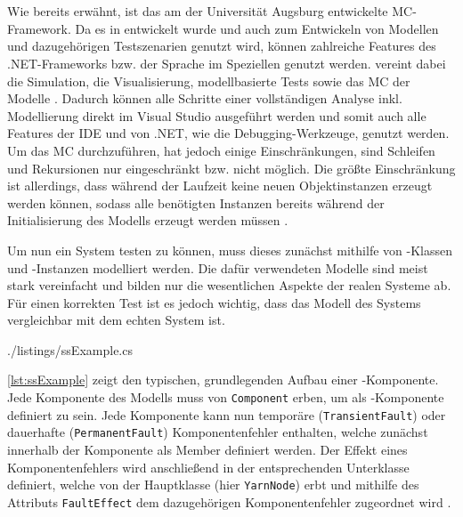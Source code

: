 \section{\sS}\label{sec:sSharp}

Wie bereits erwähnt, ist \sS das am \isse der Universität Augsburg entwickelte \ac{MC}-Framework. Da es in \cS entwickelt wurde und \cS auch zum Entwickeln von Modellen und dazugehörigen Testszenarien genutzt wird, können zahlreiche Features des .NET-Frameworks bzw. der Sprache \cS im Speziellen genutzt werden. \sS vereint dabei die Simulation, die Visualisierung, modellbasierte Tests sowie das MC der Modelle \cite{Habermaier2015,Habermaier2016}. Dadurch können alle Schritte einer vollständigen Analyse inkl. Modellierung direkt im Visual Studio ausgeführt werden und somit auch alle Features der IDE und von .NET, wie \zB die Debugging-Werkzeuge, genutzt werden. Um das \ac{MC} durchzuführen, hat \sS jedoch einige Einschränkungen, \uA sind Schleifen und Rekursionen nur eingeschränkt bzw. nicht möglich. Die größte Einschränkung ist allerdings, dass während der Laufzeit keine neuen Objektinstanzen erzeugt werden können, sodass alle benötigten Instanzen bereits während der Initialisierung des Modells erzeugt werden müssen \cite{Habermaier2015}.

Um nun ein System testen zu können, muss dieses zunächst mithilfe von \cS-Klassen und -Instanzen modelliert werden. Die dafür verwendeten Modelle sind meist stark vereinfacht und bilden nur die wesentlichen Aspekte der realen Systeme ab. Für einen korrekten Test ist es jedoch wichtig, dass das Modell des Systems vergleichbar mit dem echten System ist.


{./listings/ssExample.cs}

\autoref{lst:ssExample} zeigt den typischen, grundlegenden Aufbau einer \sS-Komponente. Jede Komponente des Modells muss von \texttt{Component} erben, um als \sS-Komponente definiert zu sein. Jede Komponente kann nun temporäre (\texttt{TransientFault}) oder dauerhafte (\texttt{PermanentFault}) Komponentenfehler enthalten, welche zunächst innerhalb der Komponente als Member definiert werden. Der Effekt eines Komponentenfehlers wird anschließend in der entsprechenden Unterklasse definiert, welche von der Hauptklasse (hier \texttt{YarnNode}) erbt und mithilfe des Attributs \texttt{FaultEffect} dem dazugehörigen Komponentenfehler zugeordnet wird \cite{Habermaier2016}.


